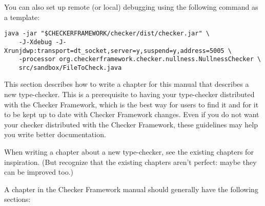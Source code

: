 You can also set up remote (or local) debugging using the following command as a template:

\begin{Verbatim}
java -jar "$CHECKERFRAMEWORK/checker/dist/checker.jar" \
    -J-Xdebug -J-Xrunjdwp:transport=dt_socket,server=y,suspend=y,address=5005 \
    -processor org.checkerframework.checker.nullness.NullnessChecker \
    src/sandbox/FileToCheck.java

\end{Verbatim}



This section describes how to write a chapter for this manual that
describes a new type-checker.  This is a prerequisite to having your
type-checker distributed with the Checker Framework, which is the best way
for users to find it and for it to be kept up to date with Checker
Framework changes.  Even if you do not want your checker distributed with
the Checker Framework, these guidelines may help you write better
documentation.

When writing a chapter about a new type-checker, see the existing chapters
for inspiration.  (But recognize that the existing chapters aren't perfect:
maybe they can be improved too.)

A chapter in the Checker Framework manual should generally have the
following sections:


